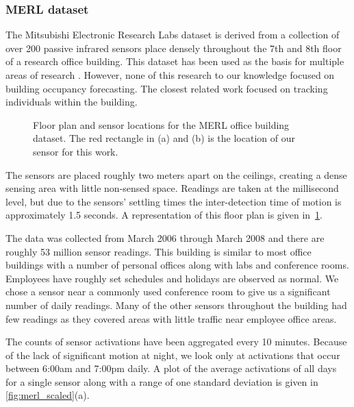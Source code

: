 \subsubsection{MERL dataset} 
The Mitsubishi Electronic Research Labs dataset is derived from a collection of over 200 passive infrared sensors place densely throughout the 7th and 8th floor of a research office building.  This dataset has been used as the basis for multiple areas of research \cite{Wren2003, Wren2006, Wren2007a, Dong2011, Minnen2004, Wren2006a, Wren2007}.  However, none of this research to our knowledge focused on building occupancy forecasting.  The closest related work focused on tracking individuals within the building.

\begin{figure}[!ht]
	\begin{center}
	\end{center}
	\caption{Floor plan and sensor locations for the MERL office building dataset.  The red rectangle in (a) and (b) is the location of our sensor for this work.}
	\label{fig:merlfloor}
\end{figure}

The sensors are placed roughly two meters apart on the ceilings, creating a dense sensing area with little non-sensed space.  Readings are taken at the millisecond level, but due to the sensors' settling times the inter-detection time of motion is approximately 1.5 seconds.  A representation of this floor plan is given in~\ref{fig:merlfloor}.

The data was collected from March 2006 through March 2008 and there are roughly 53 million sensor readings.  This building is similar to most office buildings with a number of personal offices along with labs and conference rooms.  Employees have roughly set schedules and holidays are observed as normal.  We chose a sensor near a commonly used conference room to give us a significant number of daily readings.  Many of the other sensors throughout the building had few readings as they covered areas with little traffic near employee office areas. 

The counts of sensor activations have been aggregated every 10 minutes.  Because of the lack of significant motion at night, we look only at activations that occur between 6:00am and 7:00pm daily.  A plot of the average activations of all days for a single sensor along with a range of one standard deviation is given in \ref{fig:merl_scaled}(a).

